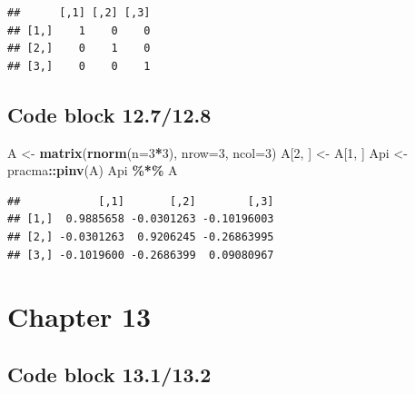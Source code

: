 \documentclass[
]{book}
\newenvironment{Shaded}{\begin{snugshade}}{\end{snugshade}}
\newcommand{\DataTypeTok}[1]{\textcolor[rgb]{0.13,0.29,0.53}{#1}}
\newcommand{\DecValTok}[1]{\textcolor[rgb]{0.00,0.00,0.81}{#1}}
\newcommand{\FloatTok}[1]{\textcolor[rgb]{0.00,0.00,0.81}{#1}}
\newcommand{\KeywordTok}[1]{\textcolor[rgb]{0.13,0.29,0.53}{\textbf{#1}}}
\newcommand{\NormalTok}[1]{#1}
\newcommand{\OperatorTok}[1]{\textcolor[rgb]{0.81,0.36,0.00}{\textbf{#1}}}
\newcommand{\OtherTok}[1]{\textcolor[rgb]{0.56,0.35,0.01}{#1}}
\newcommand{\StringTok}[1]{\textcolor[rgb]{0.31,0.60,0.02}{#1}}
\begin{document}
\begin{verbatim}
##      [,1] [,2] [,3]
## [1,]    1    0    0
## [2,]    0    1    0
## [3,]    0    0    1
\end{verbatim}

\hypertarget{code-block-12.712.8}{%
\subsection*{Code block 12.7/12.8}\label{code-block-12.712.8}}

\begin{Shaded}
\begin{Highlighting}[]
\NormalTok{A \textless{}{-}}\StringTok{ }\KeywordTok{matrix}\NormalTok{(}\KeywordTok{rnorm}\NormalTok{(}\DataTypeTok{n=}\DecValTok{3}\OperatorTok{*}\DecValTok{3}\NormalTok{), }\DataTypeTok{nrow=}\DecValTok{3}\NormalTok{, }\DataTypeTok{ncol=}\DecValTok{3}\NormalTok{)}
\NormalTok{A[}\DecValTok{2}\NormalTok{, ] \textless{}{-}}\StringTok{ }\NormalTok{A[}\DecValTok{1}\NormalTok{, ]}
\NormalTok{Api \textless{}{-}}\StringTok{ }\NormalTok{pracma}\OperatorTok{::}\KeywordTok{pinv}\NormalTok{(A)}
\NormalTok{Api }\OperatorTok{\%*\%}\StringTok{ }\NormalTok{A}
\end{Highlighting}
\end{Shaded}

\begin{verbatim}
##            [,1]       [,2]        [,3]
## [1,]  0.9885658 -0.0301263 -0.10196003
## [2,] -0.0301263  0.9206245 -0.26863995
## [3,] -0.1019600 -0.2686399  0.09080967
\end{verbatim}

\hypertarget{chapter-13}{%
\section*{Chapter 13}\label{chapter-13}}

\hypertarget{code-block-13.113.2}{%
\subsection*{Code block 13.1/13.2}\label{code-block-13.113.2}}

\begin{Shaded}
\end{Shaded}
\end{document}
